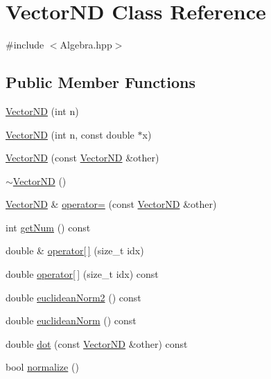 \hypertarget{class_vector_n_d}{\section{Vector\-N\-D Class Reference}
\label{class_vector_n_d}
}


{\ttfamily \#include $<$Algebra.\-hpp$>$}

\subsection*{Public Member Functions}
\begin{DoxyCompactItemize}
\item 
\hyperlink{class_vector_n_d_a04bf63cd09f861074f9f12cb8841fe9b}{Vector\-N\-D} (int n)
\item 
\hyperlink{class_vector_n_d_a3fb31d80df22f6c6fb0543b0400dadba}{Vector\-N\-D} (int n, const double $\ast$x)
\item 
\hyperlink{class_vector_n_d_ad34b1d325e217b1176b879e8567d7811}{Vector\-N\-D} (const \hyperlink{class_vector_n_d}{Vector\-N\-D} \&other)
\item 
\hyperlink{class_vector_n_d_a55968fd9a45e35a7fbed4c83cac9f0f3}{$\sim$\-Vector\-N\-D} ()
\item 
\hyperlink{class_vector_n_d}{Vector\-N\-D} \& \hyperlink{class_vector_n_d_af2942aee65afd936668105cb738fc0ad}{operator=} (const \hyperlink{class_vector_n_d}{Vector\-N\-D} \&other)
\item 
int \hyperlink{class_vector_n_d_abdbff005e6ab42f1c4dcfb43bd34f185}{get\-Num} () const 
\item 
double \& \hyperlink{class_vector_n_d_ad28f82215e7d1451dcb56313f29a80d5}{operator\mbox{[}$\,$\mbox{]}} (size\-\_\-t idx)
\item 
double \hyperlink{class_vector_n_d_abc39360878982a7a1f7d1836a28effd7}{operator\mbox{[}$\,$\mbox{]}} (size\-\_\-t idx) const 
\item 
double \hyperlink{class_vector_n_d_ab52f6d230cab5210b96d3e1017a6adea}{euclidean\-Norm2} () const 
\item 
double \hyperlink{class_vector_n_d_abf2d675f51c1265689c8781dd4631cb7}{euclidean\-Norm} () const 
\item 
double \hyperlink{class_vector_n_d_a23a9ef3d8c168a26a365fc1490ec04ef}{dot} (const \hyperlink{class_vector_n_d}{Vector\-N\-D} \&other) const 
\item 
bool \hyperlink{class_vector_n_d_a01b21f6af75960680cb3fb0117f4cb58}{normalize} ()
\end{DoxyCompactItemize}


